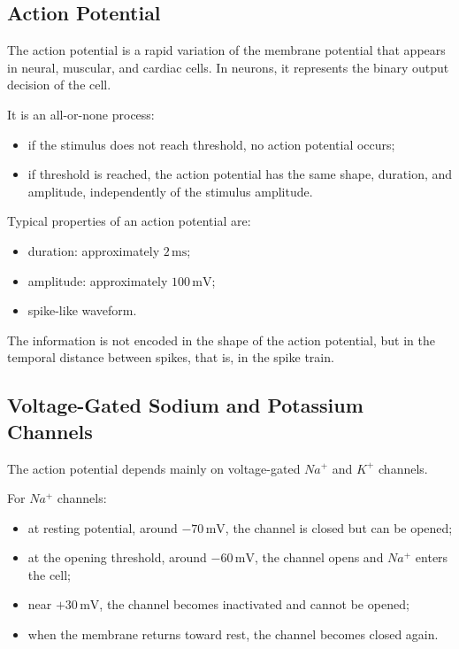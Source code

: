 \subsection{Action Potential}

The action potential is a rapid variation of the membrane potential that appears in neural, muscular, and cardiac cells. In neurons, it represents the binary output decision of the cell.

It is an all-or-none process:

\begin{itemize}[noitemsep]
    \item if the stimulus does not reach threshold, no action potential occurs;
    \item if threshold is reached, the action potential has the same shape, duration, and amplitude, independently of the stimulus amplitude.
\end{itemize}

Typical properties of an action potential are:

\begin{itemize}[noitemsep]
    \item duration: approximately $2\,\text{ms}$;
    \item amplitude: approximately $100\,\text{mV}$;
    \item spike-like waveform.
\end{itemize}

The information is not encoded in the shape of the action potential, but in the temporal distance between spikes, that is, in the spike train.

\subsection{Voltage-Gated Sodium and Potassium Channels}

The action potential depends mainly on voltage-gated $Na^+$ and $K^+$ channels.

For $Na^+$ channels:

\begin{itemize}[noitemsep]
    \item at resting potential, around $-70\,\text{mV}$, the channel is closed but can be opened;
    \item at the opening threshold, around $-60\,\text{mV}$, the channel opens and $Na^+$ enters the cell;
    \item near $+30\,\text{mV}$, the channel becomes inactivated and cannot be opened;
    \item when the membrane returns toward rest, the channel becomes closed again.
\end{itemize}

